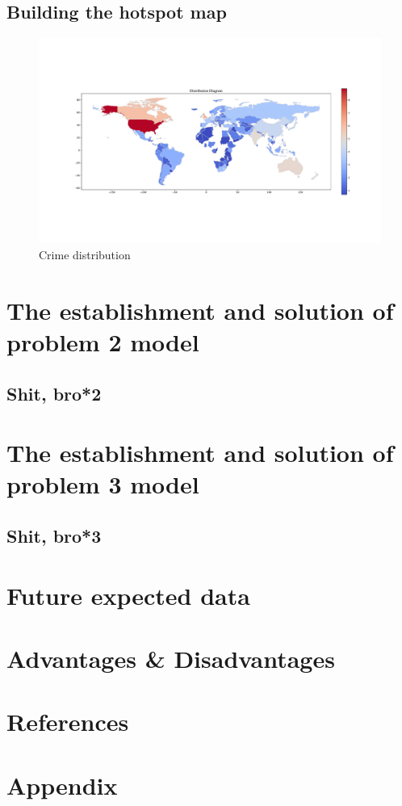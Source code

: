 \documentclass[12pt]{article}
\begin{document}
	\subsection{Building the hotspot map}\label{subsec:Building-the-hotspot-map} %
		\begin{figure}[htbp]
			\centering
			\includegraphics[width=1\textwidth]{./rsrc/Crime_distribution}
			\caption{Crime distribution}
			\label{fig:Crime-distribution}
		\end{figure}

\section{The establishment and solution of problem 2 model}\label{sec:the-establishment-and-solution-of-problem-2-model} %
	\subsection{Shit, bro*2}\label{subsec:shit-bro*2} %
	
\section{The establishment and solution of problem 3 model}\label{sec:the-establishment-and-solution-of-problem-3-model} %
	\subsection{Shit, bro*3}\label{subsec:shit-bro*3} %
	
\section{Future expected data}\label{sec:future-expected-data} %

\section{Advantages \& Disadvantages}\label{sec:advantages-&-disadvantages} %

\section{References}\label{sec:references} %

\section{Appendix}\label{sec:appendix} %
\end{document}

